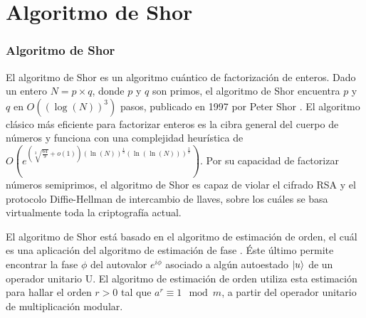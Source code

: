 \documentclass[xetex,mathserif,serif, 8pt]{beamer}
\begin{document}
\section{Algoritmo de Shor}

\begin{frame}
    \frametitle{Algoritmo de Shor}

    \justify
    El algoritmo de Shor es un algoritmo cuántico de factorización de enteros. Dado un entero $N=p \times q$, donde $p$ y $q$ son primos, el algoritmo de Shor encuentra $p$ y $q$ en $O((\log(N))^3)$ pasos, publicado en 1997 por Peter Shor \cite{Shor_1999}. El algoritmo clásico más eficiente para factorizar enteros es la cibra general del cuerpo de números y funciona con una complejidad heurística de $O(e^{(\sqrt[3]{\frac{64}{9}}+o(1))(\ln(N))^{\frac{1}{3}}(\ln(\ln(N)))^{\frac{2}{3}}})$. Por su capacidad de factorizar números semiprimos, el algoritmo de Shor es capaz de violar el cifrado RSA \cite{Bernstein_2017, Grosshans_2015} y el protocolo Diffie-Hellman de intercambio de llaves, sobre los cuáles se basa virtualmente toda la criptografía actual.
    \vspace{0.5cm}

    \justify
    El algoritmo de Shor está basado en el algoritmo de estimación de orden, el cuál es una aplicación del algoritmo de estimación de fase \cite{Nielsen_2009}. Éste último permite encontrar la fase $\phi$ del autovalor $e^{i \phi}$ asociado a algún autoestado $\ket{u}$ de un operador unitario U. El algoritmo de estimación de orden utiliza esta estimación para hallar el orden $r>0$ tal que $a^r \equiv 1 \mod m$, a partir del operador unitario de multiplicación modular.

\end{frame}
\end{document}
